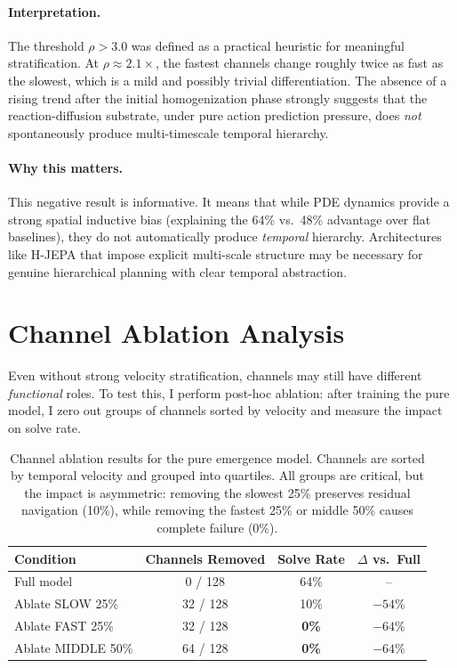 \documentclass{article}
\begin{document}
\paragraph{Interpretation.} The threshold $\rho > 3.0$ was defined as a practical heuristic for meaningful stratification. At $\rho \approx 2.1\times$, the fastest channels change roughly twice as fast as the slowest, which is a mild and possibly trivial differentiation. The absence of a rising trend after the initial homogenization phase strongly suggests that the reaction-diffusion substrate, under pure action prediction pressure, does \emph{not} spontaneously produce multi-timescale temporal hierarchy.

\paragraph{Why this matters.} This negative result is informative. It means that while PDE dynamics provide a strong spatial inductive bias (explaining the 64\% vs.\ 48\% advantage over flat baselines), they do not automatically produce \emph{temporal} hierarchy. Architectures like H-JEPA that impose explicit multi-scale structure may be necessary for genuine hierarchical planning with clear temporal abstraction.

\section{Channel Ablation Analysis}
\label{sec:ablation}

Even without strong velocity stratification, channels may still have different \emph{functional} roles. To test this, I perform post-hoc ablation: after training the pure model, I zero out groups of channels sorted by velocity and measure the impact on solve rate.

\begin{table}[h]
\centering
\caption{Channel ablation results for the pure emergence model. Channels are sorted by temporal velocity and grouped into quartiles. All groups are critical, but the impact is asymmetric: removing the slowest 25\% preserves residual navigation (10\%), while removing the fastest 25\% or middle 50\% causes complete failure (0\%).}
\label{tab:ablation}
\begin{tabular}{lccc}
\toprule
Condition & Channels Removed & Solve Rate & $\Delta$ vs.\ Full \\
\midrule
Full model & 0 / 128 & 64\% & -- \\
Ablate SLOW 25\% & 32 / 128 & 10\% & $-54\%$ \\
Ablate FAST 25\% & 32 / 128 & \textbf{0\%} & $-64\%$ \\
Ablate MIDDLE 50\% & 64 / 128 & \textbf{0\%} & $-64\%$ \\
\bottomrule
\end{tabular}
\end{table}
\end{document}
